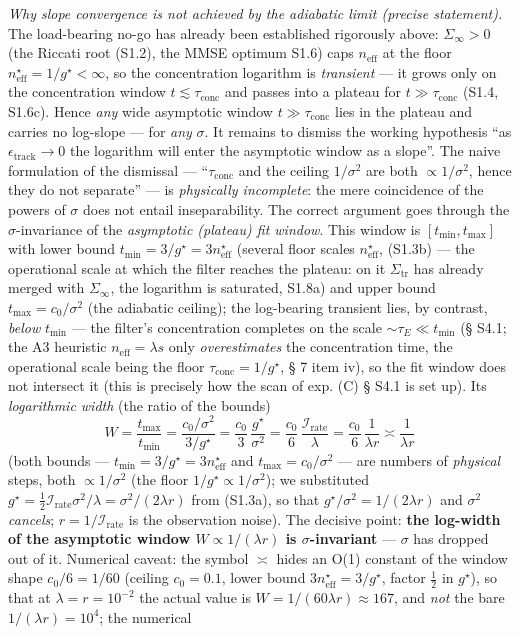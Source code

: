\documentclass[12pt]{iopart}
\begin{document}
\emph{Why slope convergence is not achieved by the adiabatic limit (precise statement).} The load-bearing no-go has already been established rigorously above: \(\Sigma_\infty > 0\) (the Riccati root (S1.2), the MMSE optimum S1.6) caps \(n_{\text{eff}}\) at the floor \(n_{\text{eff}}^\star = 1/g^\star < \infty\), so the concentration logarithm is \emph{transient} --- it grows only on the concentration window \(t \lesssim \tau_{\text{conc}}\) and passes into a plateau for \(t \gg \tau_{\text{conc}}\) (S1.4, S1.6c). Hence \emph{any} wide asymptotic window \(t \gg \tau_{\text{conc}}\) lies in the plateau and carries no log-slope --- for \emph{any} \(\sigma\). It remains to dismiss the working hypothesis ``as \(\epsilon_{\text{track}} \to 0\) the logarithm will enter the asymptotic window as a slope''. The naive formulation of the dismissal --- ``\(\tau_{\text{conc}}\) and the ceiling \(1/\sigma^2\) are both \(\propto 1/\sigma^2\), hence they do not separate'' --- is \emph{physically incomplete}: the mere coincidence of the powers of \(\sigma\) does not entail inseparability. The correct argument goes through the \(\sigma\)-invariance of the \emph{asymptotic (plateau) fit window}. This window is \([t_{\min}, t_{\max}]\) with lower bound \(t_{\min} = 3/g^\star = 3n_{\text{eff}}^\star\) (several floor scales \(n_{\text{eff}}^\star\), (S1.3b) --- the operational scale at which the filter reaches the plateau: on it \(\Sigma_{\text{tr}}\) has already merged with \(\Sigma_\infty\), the logarithm is saturated, S1.8a) and upper bound \(t_{\max} = c_0/\sigma^2\) (the adiabatic ceiling); the log-bearing transient lies, by contrast, \emph{below} \(t_{\min}\) --- the filter's concentration completes on the scale \(\sim\tau_E \ll t_{\min}\) (§ S4.1; the A3 heuristic \(n_{\text{eff}} = \lambda s\) only \emph{overestimates} the concentration time, the operational scale being the floor \(\tau_{\text{conc}} = 1/g^\star\), § 7 item iv), so the fit window does not intersect it (this is precisely how the scan of exp. (C) § S4.1 is set up). Its \emph{logarithmic width} (the ratio of the bounds) \[W = \frac{t_{\max}}{t_{\min}} = \frac{c_0/\sigma^2}{3/g^\star} = \frac{c_0}{3}\,\frac{g^\star}{\sigma^2} = \frac{c_0}{6}\,\frac{\mathcal I_{\text{rate}}}{\lambda} = \frac{c_0}{6}\,\frac{1}{\lambda r} \asymp \frac{1}{\lambda r}\] (both bounds --- \(t_{\min} = 3/g^\star = 3n_{\text{eff}}^\star\) and \(t_{\max} = c_0/\sigma^2\) --- are numbers of \emph{physical} steps, both \(\propto 1/\sigma^2\) (the floor \(1/g^\star \propto 1/\sigma^2\)); we substituted \(g^\star = \tfrac12\mathcal I_{\text{rate}}\sigma^2/\lambda = \sigma^2/(2\lambda r)\) from (S1.3a), so that \(g^\star/\sigma^2 = 1/(2\lambda r)\) and \(\sigma^2\) \emph{cancels}; \(r = 1/\mathcal I_{\text{rate}}\) is the observation noise). The decisive point: \textbf{the log-width of the asymptotic window \(W \propto 1/(\lambda r)\) is \(\sigma\)-invariant} --- \(\sigma\) has dropped out of it. Numerical caveat: the symbol \(\asymp\) hides an O(1) constant of the window shape \(c_0/6 = 1/60\) (ceiling \(c_0 = 0.1\), lower bound \(3n_{\text{eff}}^\star = 3/g^\star\), factor \(\tfrac12\) in \(g^\star\)), so that at \(\lambda = r = 10^{-2}\) the actual value is \(W = 1/(60\lambda r) \approx 167\), and \emph{not} the bare \(1/(\lambda r) = 10^4\); the numerical 
\end{document}
